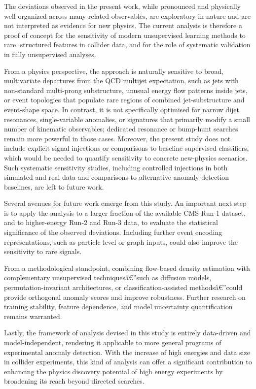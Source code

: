 \documentclass[11pt,a4paper,twocolumn]{article}
\begin{document}
The deviations observed in the present work, while pronounced and physically well-organized across many related observables, are exploratory in nature and are not interpreted as evidence for new physics. The current analysis is therefore a proof of concept for the sensitivity of modern unsupervised learning methods to rare, structured features in collider data, and for the role of systematic validation in fully unsupervised analyses.

From a physics perspective, the approach is naturally sensitive to broad, multivariate departures from the QCD multijet expectation, such as jets with non-standard multi-prong substructure, unusual energy flow patterns inside jets, or event topologies that populate rare regions of combined jet-substructure and event-shape space. In contrast, it is not specifically optimised for narrow dijet resonances, single-variable anomalies, or signatures that primarily modify a small number of kinematic observables; dedicated resonance or bump-hunt searches remain more powerful in those cases. Moreover, the present study does not include explicit signal injections or comparisons to baseline supervised classifiers, which would be needed to quantify sensitivity to concrete new-physics scenarios. Such systematic sensitivity studies, including controlled injections in both simulated and real data and comparisons to alternative anomaly-detection baselines, are left to future work.

Several avenues for future work emerge from this study. An important next step is to apply the analysis to a larger fraction of the available CMS Run-1 dataset, and to higher-energy Run-2 and Run-3 data, to evaluate the statistical significance of the observed deviations. Including further event encoding representations, such as particle-level or graph inputs, could also improve the sensitivity to rare signals.

From a methodological standpoint, combining flow-based density estimation with complementary unsupervised techniquesâ€”such as diffusion models, permutation-invariant architectures, or classification-assisted methodsâ€”could provide orthogonal anomaly scores and improve robustness. Further research on training stability, feature dependence, and model uncertainty quantification remains warranted.

Lastly, the framework of analysis devised in this study is entirely data-driven and model-independent, rendering it applicable to more general programs of experimental anomaly detection. With the increase of high energies and data size in collider experiments, this kind of analysis can offer a significant contribution to enhancing the physics discovery potential of high energy experiments by broadening its reach beyond directed searches.
\end{document}

